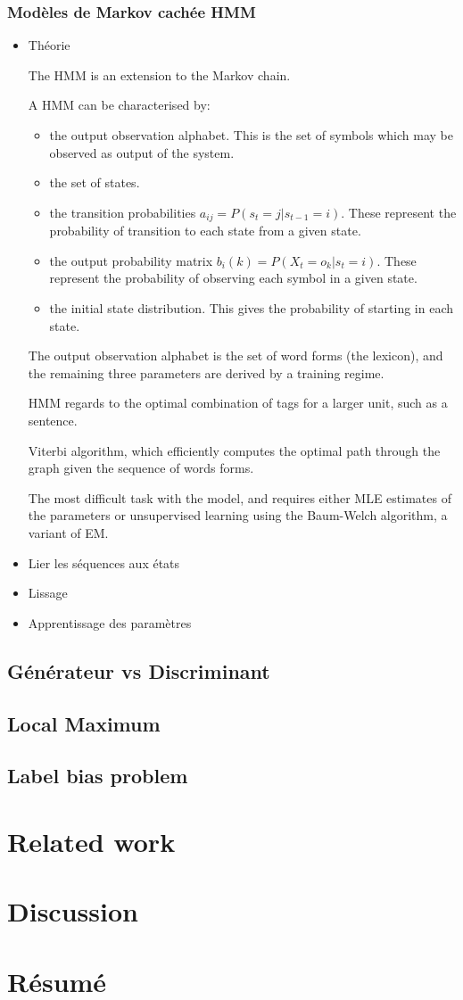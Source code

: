 \documentclass[a4paper]{article}
\begin{document}
\subsubsection{Modèles de Markov cachée HMM}
\begin{itemize}
\item Théorie

The HMM is an extension to the Markov chain.

A HMM can be characterised by:
\begin{itemize}
\item the output observation alphabet. This is the set of symbols which may be observed as output of the system.
\item the set of states.
\item the transition probabilities $a_{ij} = P(s_t = j | s_{t-1} = i)$. These represent the probability of transition to each state from a given state.
\item the output probability matrix $b_i(k) = P(X_t = o_k | s_t = i)$. These represent the probability of observing each symbol in a given state.
\item the initial state distribution. This gives the probability of starting in each state.
\end{itemize}

The output observation alphabet is the set of word forms (the lexicon), and the 
remaining three parameters are derived by a training regime.

HMM regards to the optimal combination of tags for a larger unit, such as a sentence.

Viterbi algorithm, which efficiently computes the optimal path through the graph given the sequence of words forms.

The most difficult task with the model, and requires either MLE estimates of the parameters or unsupervised learning using the Baum-Welch algorithm, a variant of EM.


\item Lier les séquences aux états
\item Lissage
\item Apprentissage des paramètres
\end{itemize}


\subsection{Générateur vs Discriminant}

\subsection{Local Maximum}

\subsection{Label bias problem}

\section{Related work}
\section{Discussion}
\section{Résumé}
\cite{greenwade93}




\end{document}
